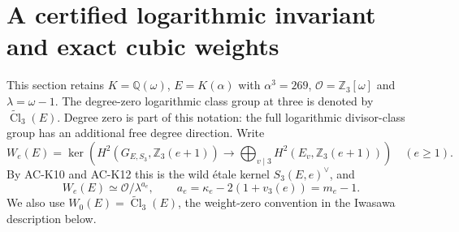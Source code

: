 \section{A certified logarithmic invariant and exact cubic weights}
\label{sec:cubic-logarithmic}

This section retains $K=\mathbb Q(\omega)$,
$E=K(\alpha)$ with $\alpha^3=269$,
$\mathcal O=\mathbb Z_3[\omega]$ and $\lambda=\omega-1$.
The degree-zero logarithmic class group at three is denoted by
$\widetilde{\operatorname{Cl}}_3(E)$.  Degree zero is part of this
notation: the full logarithmic divisor-class group has an additional
free degree direction.  Write
\[
 W_e(E)=\ker\left(H^2(G_{E,S_3},\mathbb Z_3(e+1))
       \longrightarrow\bigoplus_{v\mid3}
                   H^2(E_v,\mathbb Z_3(e+1))\right) \quad(e\geq1).
\]
By AC-K10 and AC-K12 this is the wild \'etale kernel
$S_3(E,e)^\vee$, and
\[
 W_e(E)\simeq\mathcal O/\lambda^{a_e},\qquad
 a_e=\kappa_e-2(1+v_3(e))=m_e-1.                    \tag{KL.1}
\]
We also use $W_0(E)=\widetilde{\operatorname{Cl}}_3(E)$, the
weight-zero convention in the Iwasawa description below.

